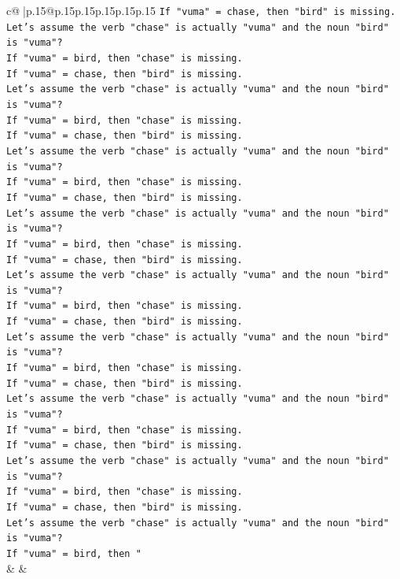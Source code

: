 \documentclass{article}
\begin{document}
{\begin{supertabular}{c@{$\;$}|p{.15\linewidth}@{}p{.15\linewidth}p{.15\linewidth}p{.15\linewidth}p{.15\linewidth}p{.15\linewidth}}
{{{\texttt{If "vuma" = chase, then "bird" is missing.} \\
\texttt{Let's assume the verb "chase" is actually "vuma" and the noun "bird" is "vuma"?} \\
\texttt{If "vuma" = bird, then "chase" is missing.} \\
\texttt{If "vuma" = chase, then "bird" is missing.} \\
\texttt{Let's assume the verb "chase" is actually "vuma" and the noun "bird" is "vuma"?} \\
\texttt{If "vuma" = bird, then "chase" is missing.} \\
\texttt{If "vuma" = chase, then "bird" is missing.} \\
\texttt{Let's assume the verb "chase" is actually "vuma" and the noun "bird" is "vuma"?} \\
\texttt{If "vuma" = bird, then "chase" is missing.} \\
\texttt{If "vuma" = chase, then "bird" is missing.} \\
\texttt{Let's assume the verb "chase" is actually "vuma" and the noun "bird" is "vuma"?} \\
\texttt{If "vuma" = bird, then "chase" is missing.} \\
\texttt{If "vuma" = chase, then "bird" is missing.} \\
\texttt{Let's assume the verb "chase" is actually "vuma" and the noun "bird" is "vuma"?} \\
\texttt{If "vuma" = bird, then "chase" is missing.} \\
\texttt{If "vuma" = chase, then "bird" is missing.} \\
\texttt{Let's assume the verb "chase" is actually "vuma" and the noun "bird" is "vuma"?} \\
\texttt{If "vuma" = bird, then "chase" is missing.} \\
\texttt{If "vuma" = chase, then "bird" is missing.} \\
\texttt{Let's assume the verb "chase" is actually "vuma" and the noun "bird" is "vuma"?} \\
\texttt{If "vuma" = bird, then "chase" is missing.} \\
\texttt{If "vuma" = chase, then "bird" is missing.} \\
\texttt{Let's assume the verb "chase" is actually "vuma" and the noun "bird" is "vuma"?} \\
\texttt{If "vuma" = bird, then "chase" is missing.} \\
\texttt{If "vuma" = chase, then "bird" is missing.} \\
\texttt{Let's assume the verb "chase" is actually "vuma" and the noun "bird" is "vuma"?} \\
\texttt{If "vuma" = bird, then "} \\
            }
        }
    }
    & & \\ \\


\end{supertabular}}
\end{document}
